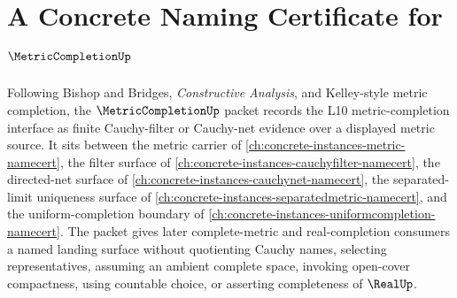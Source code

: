\chapter{A Concrete Naming Certificate for $\MetricCompletionUp$}
\label{ch:concrete-instances-metriccompletion-namecert}

Following Bishop and Bridges, \emph{Constructive Analysis}, and Kelley-style metric completion, the $\MetricCompletionUp$ packet records the L10 metric-completion interface as finite Cauchy-filter or Cauchy-net evidence over a displayed metric source. It sits between the metric carrier of \autoref{ch:concrete-instances-metric-namecert}, the filter surface of \autoref{ch:concrete-instances-cauchyfilter-namecert}, the directed-net surface of \autoref{ch:concrete-instances-cauchynet-namecert}, the separated-limit uniqueness surface of \autoref{ch:concrete-instances-separatedmetric-namecert}, and the uniform-completion boundary of \autoref{ch:concrete-instances-uniformcompletion-namecert}. The packet gives later complete-metric and real-completion consumers a named landing surface without quotienting Cauchy names, selecting representatives, assuming an ambient complete space, invoking open-cover compactness, using countable choice, or asserting completeness of $\RealUp$.

